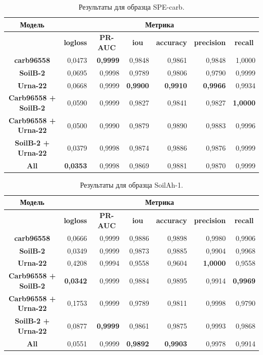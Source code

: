 \documentclass[12pt, a4paper]{extarticle}
\begin{document}
\begin{table}[htbp]
\small
\begin{tabular}{|c|r|r|r|r|r|r|}
\hline
\textbf{Модель} & \multicolumn{ 6}{c|}{\textbf{Метрика}} \\ \hline
\textbf{} & \multicolumn{1}{c|}{\textbf{logloss}} & \multicolumn{1}{c|}{\textbf{PR-AUC}} & \multicolumn{1}{c|}{\textbf{iou}} & \multicolumn{1}{c|}{\textbf{accuracy}} & \multicolumn{1}{c|}{\textbf{precision}} & \multicolumn{1}{c|}{\textbf{recall}} \\ \hline
\textbf{carb96558} & 0,0473 & \textbf{0,9999} & 0,9848 & 0,9861 & 0,9848 & 1,0000 \\ \hline
\textbf{SoilB-2} & 0,0695 & 0,9998 & 0,9789 & 0,9806 & 0,9790 & 0,9999 \\ \hline
\textbf{Urna-22} & 0,0668 & 0,9999 & \textbf{0,9900} & \textbf{0,9910} & \textbf{0,9966} & 0,9934 \\ \hline
\textbf{Carb96558 + SoilB-2} & 0,0590 & 0,9999 & 0,9827 & 0,9841 & 0,9827 & \textbf{1,0000} \\ \hline
\textbf{Carb96558 + Urna-22} & 0,0500 & 0,9990 & 0,9879 & 0,9890 & 0,9883 & 0,9996 \\ \hline
\textbf{SoilB-2 + Urna-22} & 0,0379 & 0,9998 & 0,9874 & 0,9886 & 0,9876 & 0,9999 \\ \hline
\textbf{All} & \textbf{0,0353} & 0,9998 & 0,9869 & 0,9881 & 0,9870 & 0,9999 \\ \hline
\end{tabular}
\caption{Результаты для образца SPE-carb.}
\label{SPE_carb}
\end{table}


\begin{table}[htbp]
\small
\begin{tabular}{|c|r|r|r|r|r|r|}
\hline
\textbf{Модель} & \multicolumn{ 6}{c|}{\textbf{Метрика}} \\ \hline
\textbf{} & \multicolumn{1}{c|}{\textbf{logloss}} & \multicolumn{1}{c|}{\textbf{PR-AUC}} & \multicolumn{1}{c|}{\textbf{iou}} & \multicolumn{1}{c|}{\textbf{accuracy}} & \multicolumn{1}{c|}{\textbf{precision}} & \multicolumn{1}{c|}{\textbf{recall}} \\ \hline
\textbf{carb96558} & 0,0666 & 0,9999 & 0,9886 & 0,9898 & 0,9980 & 0,9906 \\ \hline
\textbf{SoilB-2} & 0,0349 & 0,9999 & 0,9873 & 0,9885 & 0,9904 & 0,9968 \\ \hline
\textbf{Urna-22} & 0,4208 & 0,9994 & 0,9558 & 0,9604 & \textbf{1,0000} & 0,9558 \\ \hline
\textbf{Carb96558 + SoilB-2} & \textbf{0,0342} & 0,9999 & 0,9884 & 0,9895 & 0,9914 & \textbf{0,9969} \\ \hline
\textbf{Carb96558 + Urna-22} & 0,1753 & 0,9999 & 0,9789 & 0,9811 & 0,9998 & 0,9790 \\ \hline
\textbf{SoilB-2 + Urna-22} & 0,0877 & \textbf{0,9999} & 0,9861 & 0,9875 & 0,9993 & 0,9868 \\ \hline
\textbf{All} & 0,0551 & 0,9999 & \textbf{0,9892} & \textbf{0,9903} & 0,9978 & 0,9914 \\ \hline
\end{tabular}
\caption{Результаты для образца SoilAh-1.}
\label{SoilAh-1}
\end{table}
\end{document}
